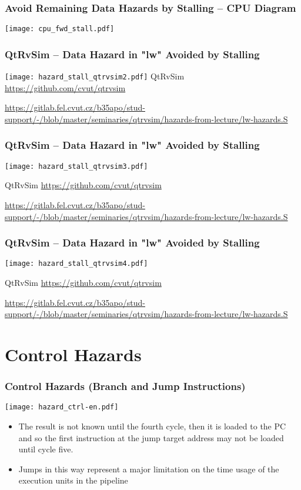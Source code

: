 \documentclass{beamer}
\begin{document}
\begin{frame}
\frametitle{Avoid Remaining Data Hazards by Stalling -- CPU Diagram}
\texttt{[image: cpu\_fwd\_stall.pdf]}
\end{frame}

\begin{frame}
\frametitle{QtRvSim -- Data Hazard in "lw" Avoided by Stalling}
\texttt{[image: hazard\_stall\_qtrvsim2.pdf]}
{\tiny
QtRvSim \url{https://github.com/cvut/qtrvsim}
}

{\Tiny
\url{https://gitlab.fel.cvut.cz/b35apo/stud-support/-/blob/master/seminaries/qtrvsim/hazards-from-lecture/lw-hazards.S}
}

\end{frame}

\begin{frame}
\frametitle{QtRvSim -- Data Hazard in "lw" Avoided by Stalling}
\texttt{[image: hazard\_stall\_qtrvsim3.pdf]}

{\tiny
QtRvSim \url{https://github.com/cvut/qtrvsim}
}

{\Tiny
\url{https://gitlab.fel.cvut.cz/b35apo/stud-support/-/blob/master/seminaries/qtrvsim/hazards-from-lecture/lw-hazards.S}
}

\end{frame}

\begin{frame}
\frametitle{QtRvSim -- Data Hazard in "lw" Avoided by Stalling}
\texttt{[image: hazard\_stall\_qtrvsim4.pdf]}

{\tiny
QtRvSim \url{https://github.com/cvut/qtrvsim}
}

{\Tiny
\url{https://gitlab.fel.cvut.cz/b35apo/stud-support/-/blob/master/seminaries/qtrvsim/hazards-from-lecture/lw-hazards.S}
}

\end{frame}

\section{Control Hazards}

\begin{frame}
\frametitle{Control Hazards (Branch and Jump Instructions)}
\texttt{[image: hazard\_ctrl-en.pdf]}

\begin{itemize}
 \item The result is not known until the fourth cycle, then it is loaded to the PC
       and so the first instruction at the jump target address may not be loaded until cycle five.
 \item Jumps in this way represent a major limitation on the time usage of the execution units in the pipeline
\end{itemize}

\end{frame}
\end{document}
